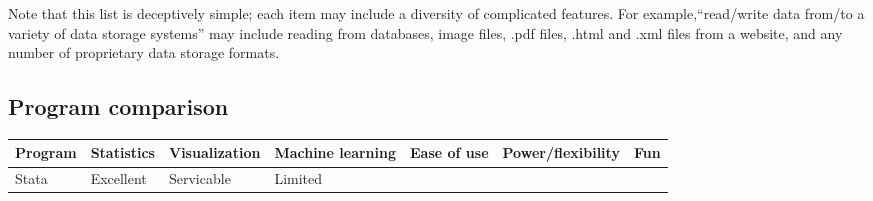 \documentclass[
]{book}
\begin{document}
Note that this list is deceptively simple; each item may include a diversity of complicated features. For example,``read/write data from/to a variety of data storage systems'' may include reading from databases, image files, .pdf files, .html and .xml files from a website, and any number of proprietary data storage formats.

\hypertarget{program-comparison}{%
\subsection{Program comparison}\label{program-comparison}}

\begin{longtable}[]{@{}lllllll@{}}
\toprule
\begin{minipage}[b]{0.08\columnwidth}\raggedright
Program\strut
\end{minipage} & \begin{minipage}[b]{0.10\columnwidth}\raggedright
Statistics\strut
\end{minipage} & \begin{minipage}[b]{0.13\columnwidth}\raggedright
Visualization\strut
\end{minipage} & \begin{minipage}[b]{0.16\columnwidth}\raggedright
Machine learning\strut
\end{minipage} & \begin{minipage}[b]{0.11\columnwidth}\raggedright
Ease of use\strut
\end{minipage} & \begin{minipage}[b]{0.17\columnwidth}\raggedright
Power/flexibility\strut
\end{minipage} & \begin{minipage}[b]{0.05\columnwidth}\raggedright
Fun\strut
\end{minipage}\tabularnewline
\midrule
\endhead
\begin{minipage}[t]{0.08\columnwidth}\raggedright
Stata\strut
\end{minipage} & \begin{minipage}[t]{0.10\columnwidth}\raggedright
Excellent\strut
\end{minipage} & \begin{minipage}[t]{0.13\columnwidth}\raggedright
Servicable\strut
\end{minipage} & \begin{minipage}[t]{0.16\columnwidth}\raggedright
Limited\strut
\end{minipage} & \begin{minipage}[t]{0.11\columnwidth}\raggedright

\end{minipage}
\end{longtable}
\end{document}

